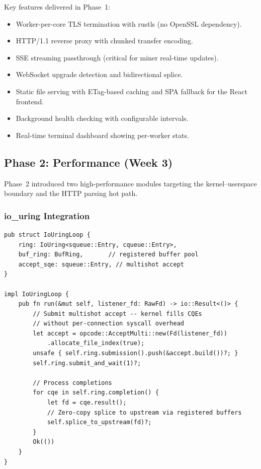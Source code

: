 \documentclass[a4paper, 11pt]{article}
\begin{document}
Key features delivered in Phase~1:

\begin{itemize}[nosep]
  \item Worker-per-core TLS termination with rustls (no OpenSSL dependency).
  \item HTTP/1.1 reverse proxy with chunked transfer encoding.
  \item SSE streaming passthrough (critical for miner real-time updates).
  \item WebSocket upgrade detection and bidirectional splice.
  \item Static file serving with ETag-based caching and SPA fallback for
        the React frontend.
  \item Background health checking with configurable intervals.
  \item Real-time terminal dashboard showing per-worker stats.
\end{itemize}

\subsection{Phase 2: Performance (Week 3)}

Phase~2 introduced two high-performance modules targeting the
kernel--userspace boundary and the HTTP parsing hot path.

\subsubsection{io\_uring Integration}

\begin{lstlisting}[caption={io\_uring multishot accept (simplified)},
  label=lst:iouring]
pub struct IoUringLoop {
    ring: IoUring<squeue::Entry, cqueue::Entry>,
    buf_ring: BufRing,       // registered buffer pool
    accept_sqe: squeue::Entry, // multishot accept
}

impl IoUringLoop {
    pub fn run(&mut self, listener_fd: RawFd) -> io::Result<()> {
        // Submit multishot accept -- kernel fills CQEs
        // without per-connection syscall overhead
        let accept = opcode::AcceptMulti::new(Fd(listener_fd))
            .allocate_file_index(true);
        unsafe { self.ring.submission().push(&accept.build())?; }
        self.ring.submit_and_wait(1)?;

        // Process completions
        for cqe in self.ring.completion() {
            let fd = cqe.result();
            // Zero-copy splice to upstream via registered buffers
            self.splice_to_upstream(fd)?;
        }
        Ok(())
    }
}
\end{lstlisting}
\end{document}
